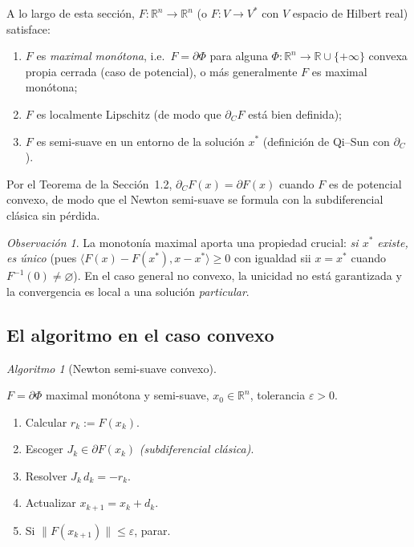 \documentclass[12pt]{book}
\newcommand{\R}{\mathbb{R}}
\newcommand{\subdiffC}{\partial_C}
\newcommand{\subdiffR}{\partial}
\theoremstyle{definition}
\theoremstyle{plain}
\theoremstyle{remark}
\newtheorem{observacion}{Observación}[section]
\newtheorem{algoritmo}{Algoritmo}[section]
\begin{document}
  A lo largo de esta sección, $F:\R^n\to\R^n$ (o $F:V\to V^*$ con $V$
  espacio de Hilbert real) satisface:
  \begin{enumerate}[label=\textup{(\roman*)},leftmargin=1.6em,itemsep=1pt]
    \item $F$ es \emph{maximal monótona}, i.e.\ $F=\subdiffR \Phi$
          para alguna $\Phi:\R^n\to\R\cup\{+\infty\}$ convexa propia
          cerrada (caso de potencial), o más generalmente $F$ es
          maximal monótona;
    \item $F$ es localmente Lipschitz (de modo que $\subdiffC F$
          está bien definida);
    \item $F$ es semi-suave en un entorno de la solución $x^*$
          (definición de Qi--Sun con $\subdiffC$).
  \end{enumerate}
  Por el Teorema de la Sección~1.2, $\subdiffC F(x)=\subdiffR F(x)$
  cuando $F$ es de potencial convexo, de modo que el Newton
  semi-suave se formula con la subdiferencial clásica sin pérdida.

\begin{observacion}
  La monotonía maximal aporta una propiedad crucial: \emph{si $x^*$
  existe, es único} (pues $\langle F(x)-F(x^*),x-x^*\rangle\ge0$
  con igualdad sii $x=x^*$ cuando $F^{-1}(0)\neq\varnothing$).  En
  el caso general no convexo, la unicidad no está garantizada y la
  convergencia es local a una solución \emph{particular}.
\end{observacion}

\subsection{El algoritmo en el caso convexo}

\begin{algoritmo}[Newton semi-suave convexo]
  \hfill
  \begin{description}[leftmargin=1.2em,itemsep=2pt]
    \item[Entrada] $F=\subdiffR \Phi$ maximal monótona y semi-suave,
      $x_0\in\R^n$, tolerancia $\varepsilon>0$.
    \item[Paso $k\ge0$]
      \begin{enumerate}[leftmargin=1.4em,itemsep=1pt]
        \item Calcular $r_k:=F(x_k)$.
        \item Escoger $J_k\in\subdiffR F(x_k)$ \emph{(subdiferencial
              clásica)}.
        \item Resolver $J_k\,d_k=-r_k$.
        \item Actualizar $x_{k+1}=x_k+d_k$.
        \item Si $\|F(x_{k+1})\|\le\varepsilon$, parar.
      \end{enumerate}
  \end{description}
\end{algoritmo}
\end{document}
